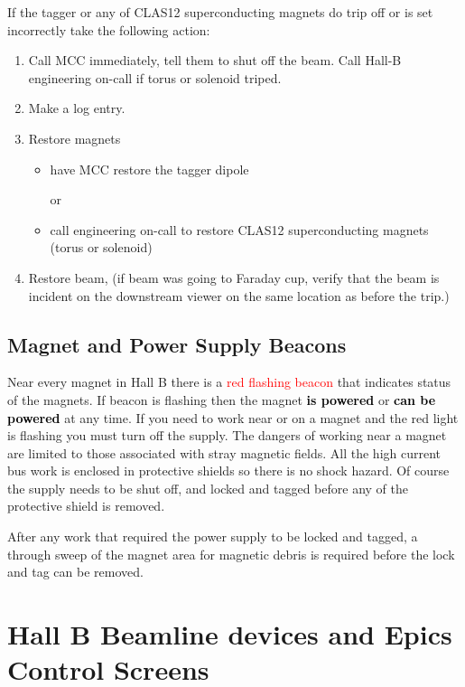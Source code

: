 \documentclass[12pt]{article}
\begin{document}
If the tagger or any of CLAS12 superconducting magnets do trip off or is set incorrectly take the following action:

\begin{enumerate}
\item Call MCC immediately, tell them to shut off the beam. Call Hall-B engineering on-call if torus or solenoid triped.
\item Make a log entry.
\item Restore magnets 
\begin{itemize}
\item have MCC restore the tagger dipole 

or 

\item call engineering on-call to restore CLAS12 superconducting magnets (torus or solenoid)
\end{itemize}
\item Restore beam, (if beam was going to Faraday cup, verify that the beam is incident on the downstream viewer on the same location as before the trip.)
\end{enumerate}

\subsection{Magnet and Power Supply Beacons}
\indent

Near every magnet in Hall B there is a \textcolor{red}{red flashing beacon} that indicates status of the magnets. If beacon is
flashing then the magnet \textbf{\textcolor{black}{is powered}} or \textbf{\textcolor{black}{can be powered}} at
any time. If you need to work near or on a magnet and the red light is flashing
you must turn off the supply. The dangers of working
near a magnet are limited to those associated with stray magnetic fields. All
the high current bus work is enclosed in protective shields so there is no shock
hazard. Of course the supply needs to be shut off, and locked and tagged before
any of the protective shield is removed.

After any work that required the power supply to be locked and tagged, a through
sweep of the magnet area for magnetic debris is required before the lock and
tag can be removed.


\section{Hall B Beamline devices and Epics Control Screens}
\end{document}
